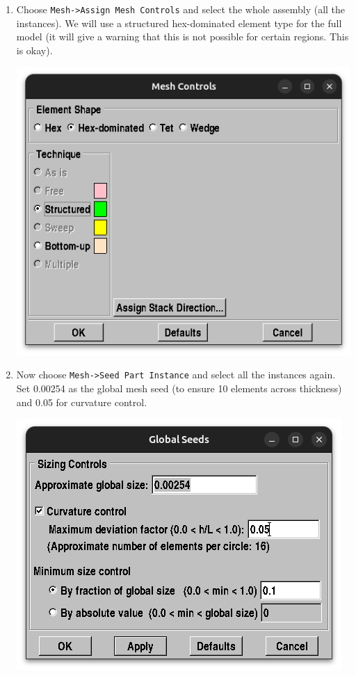 \documentclass[11pt]{article}
\begin{document}
\begin{enumerate}
\item Choose \texttt{Mesh->Assign Mesh Controls} and select the whole assembly (all the instances).
We will use a structured hex-dominated element type for the full model (it will give a warning that this is not possible for certain regions. This is okay).
\begin{center}
\includegraphics[width=.9\linewidth]{./figs/globmesh.png}
\end{center}
\item Now choose \texttt{Mesh->Seed Part Instance} and select all the instances again.
Set 0.00254 as the global mesh seed (to ensure 10 elements across thickness) and 0.05 for curvature control.
\begin{center}
\includegraphics[width=.9\linewidth]{./figs/gmeshseed.png}

\end{center}
\end{enumerate}
\end{document}
